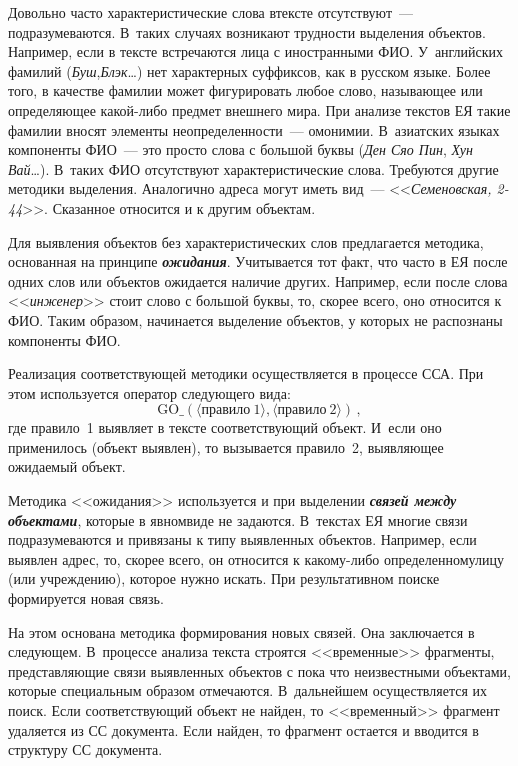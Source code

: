 \begin{multicols}{2}
     Довольно часто характеристические слова в\linebreak тексте отсутствуют~--- 
подразумеваются. В~таких случаях возникают трудности выделения объектов.\linebreak 
Например, если в тексте встречаются лица с иностранными ФИО. 
У~английских фамилий (\textit{Буш},\linebreak \textit{Блэк}\ldots) нет характерных 
суффиксов, как в русском языке. Более того, в качестве фамилии может 
фигурировать любое слово, называющее или определяющее ка\-кой-ли\-бо 
предмет внешнего мира. При анализе текстов ЕЯ такие фамилии вносят 
элементы неопределенности~--- омонимии. В~азиатских языках компоненты 
ФИО~--- это просто слова с большой буквы (\textit{Ден Сяо Пин}, \textit{Хун 
Вай}\ldots). В~таких ФИО отсутствуют характеристические слова. Требуются 
другие методики выделения. Аналогично адреса могут иметь вид~--- 
<<\textit{Семеновская, 2-44}>>. Сказанное относится и к другим объектам. 
     
     Для выявления объектов без характеристических слов предлагается 
методика, основанная на принципе {\bfseries\textit{ожидания}}. Учитывается 
тот факт, что часто в ЕЯ после одних слов или объектов ожидается наличие 
других. Например, если после слова <<\textit{инженер}>> стоит слово с 
большой буквы, то, скорее всего, оно относится к ФИО. Таким образом, 
начинается выделение объектов, у которых не распознаны компоненты ФИО. 
     
     Реализация соответствующей методики осуществляется в процессе 
ССА. При этом используется  оператор следующего вида:
$$     
     \mathrm{GO}\_(\langle\mathrm{правило}~1\rangle,\langle\mathrm{правило}~2\rangle)\,, 
     $$
где правило~1 выявляет в тексте соответствующий объект. И~если оно 
применилось (объект выявлен), то вызывается правило~2, выявляющее 
ожидаемый объект.
     
     Методика <<ожидания>> используется и при выделении 
{\bfseries\textit{связей между объектами}}, которые в явном\linebreak виде не задаются. 
В~текстах ЕЯ многие связи подразумеваются и привязаны к типу выявленных 
объектов. Например, если выявлен адрес, то, скорее всего, он относится к 
какому-либо определенному\linebreak лицу (или учреждению), которое нужно искать. 
При результативном поиске формируется новая связь. 
     
     На этом основана методика формирования новых связей. Она 
заключается в следующем. В~процессе анализа текста строятся <<временные>> 
фрагменты, представляющие связи выявленных \mbox{объектов} с пока что 
неизвестными объектами, которые специальным образом отмечаются. 
В~дальнейшем осуществляется их поиск. Если соответст\-ву\-ющий объект не 
найден, то <<временный>> фрагмент удаляется из СС документа. Если найден, 
то фрагмент остается и вводится в структуру СС документа.
     

\end{multicols}
